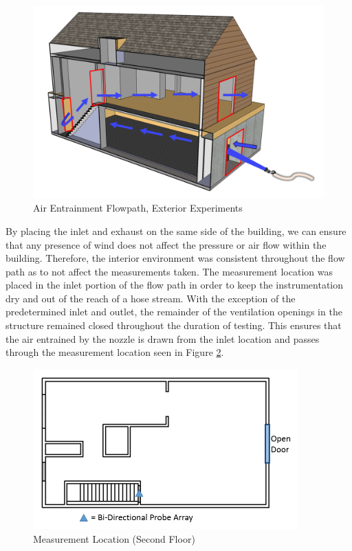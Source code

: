 \documentclass{article}
\begin{document}
\begin{figure}[!ht]
	\centering
	\includegraphics[width=4.5in]{Figures/Air_Entrainment/Airflow_Layout_Ext.png}
	\caption{Air Entrainment Flowpath, Exterior Experiments}
	\label{fig:Air_Entrainment_Flowpath_Exterior_Experiments}
\end{figure}

\clearpage

By placing the inlet and exhaust on the same side of the building, we can ensure that any presence of wind does not affect the pressure or air flow within the building. Therefore, the interior environment was consistent throughout the flow path as to not affect the measurements taken. The measurement location was placed in the inlet portion of the flow path in order to keep the instrumentation dry and out of the reach of a hose stream. With the exception of the predetermined inlet and outlet, the remainder of the ventilation openings in the structure remained closed throughout the duration of testing. This ensures that the air entrained by the nozzle is drawn from the inlet location and passes through the measurement location seen in Figure \ref{fig:Measurement_Location_Second_Floor}.

\begin{figure}[!ht]
	\centering
	\includegraphics[width=4in]{Figures/Air_Entrainment/Measurement_Locations_Secondfloor.png}
	\caption{Measurement Location (Second Floor)}
	\label{fig:Measurement_Location_Second_Floor}
\end{figure}
\end{document}
